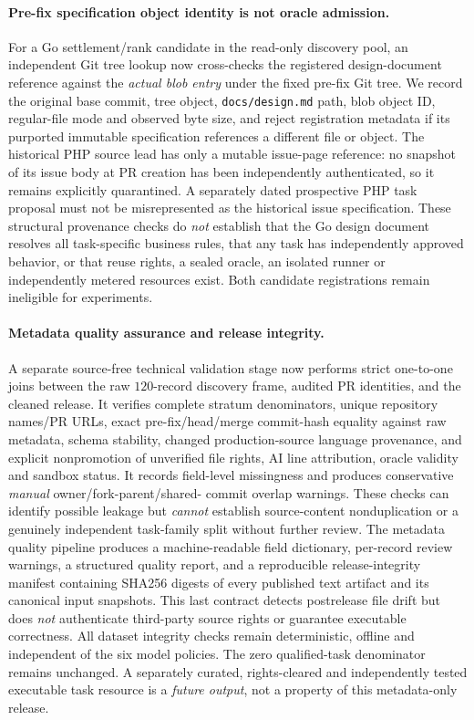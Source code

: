 \documentclass[pdflatex,sn-basic]{sn-jnl}
\begin{document}
\paragraph{Pre-fix specification object identity is not oracle admission.}
For a Go settlement/rank candidate in the read-only
discovery pool, an independent Git tree lookup now
cross-checks the registered design-document reference
against the \emph{actual blob entry} under the fixed
pre-fix Git tree. We record the original base commit,
tree object, \texttt{docs/design.md} path, blob object ID,
regular-file mode and observed byte size, and reject
registration metadata if its purported immutable
specification references a different file or object.
The historical PHP source lead has only a mutable
issue-page reference: no snapshot of its issue body
at PR creation has been independently authenticated,
so it remains explicitly quarantined. A separately
dated prospective PHP task proposal must not be
misrepresented as the historical issue specification.
These structural provenance checks do \emph{not}
establish that the Go design document resolves all
task-specific business rules, that any task has
independently approved behavior, or that reuse
rights, a sealed oracle, an isolated runner or
independently metered resources exist. Both candidate
registrations remain ineligible for experiments.

\paragraph{Metadata quality assurance and release integrity.}
A separate source-free technical validation stage now
performs strict one-to-one joins between the raw
$120$-record discovery frame, audited PR identities,
and the cleaned release. It verifies complete
stratum denominators, unique repository names/PR URLs,
exact pre-fix/head/merge commit-hash equality
against raw metadata, schema stability, changed
production-source language provenance, and explicit
nonpromotion of unverified file rights, AI line
attribution, oracle validity and sandbox status.
It records field-level missingness and produces
conservative \emph{manual} owner/fork-parent/shared-
commit overlap warnings. These checks can identify
possible leakage but \emph{cannot} establish
source-content nonduplication or a genuinely
independent task-family split without further
review. The metadata quality pipeline produces a
machine-readable field dictionary, per-record
review warnings, a structured quality report,
and a reproducible release-integrity manifest
containing SHA256 digests of every published text
artifact and its canonical input snapshots.
This last contract detects postrelease file drift
but does \emph{not} authenticate third-party
source rights or guarantee executable correctness.
All dataset integrity checks remain deterministic,
offline and independent of the six model policies.
The zero qualified-task denominator remains
unchanged. A separately curated, rights-cleared
and independently tested executable task resource
is a \emph{future output}, not a property of this
metadata-only release.
\end{document}
